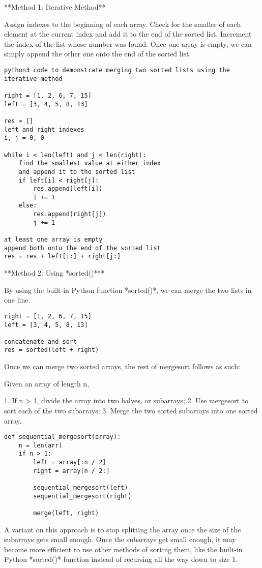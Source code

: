 **Method 1: Iterative Method**

Assign indexes to the beginning of each array. Check for the smaller of each element at the current index and add it to
the end of the sorted list. Increment the index of the list whose number was found. Once one array is empty, we can
simply append the other one onto the end of the sorted list.

\begin{verbatim}
python3 code to demonstrate merging two sorted lists using the iterative method

right = [1, 2, 6, 7, 15]
left = [3, 4, 5, 8, 13]

res = []
left and right indexes
i, j = 0, 0

while i < len(left) and j < len(right):
    find the smallest value at either index 
    and append it to the sorted list
    if left[i] < right[j]:
        res.append(left[i])
        i += 1
    else:
        res.append(right[j])
        j += 1

at least one array is empty
append both onto the end of the sorted list
res = res + left[i:] + right[j:]
\end{verbatim}

**Method 2: Using *sorted()***

By using the built-in Python function *sorted()*, we can merge the two lists in one line.

\begin{verbatim}
right = [1, 2, 6, 7, 15]
left = [3, 4, 5, 8, 13]

concatenate and sort
res = sorted(left + right)
\end{verbatim}

Once we can merge two sorted arrays, the rest of mergesort follows as such:

Given an array of length n,

1. If n > 1, divide the array into two halves, or subarrays;
2. Use mergesort to sort each of the two subarrays;
3. Merge the two sorted subarrays into one sorted array.

\begin{verbatim}
def sequential_mergesort(array):
    n = len(arr)
    if n > 1:
        left = array[:n / 2]
        right = array[n / 2:]

        sequential_mergesort(left)
        sequential_mergesort(right)

        merge(left, right)
\end{verbatim}

A variant on this approach is to stop splitting the array once the size of the subarrays gets small enough. Once the
subarrays get small enough, it may become more efficient to use other methods of sorting them, like the built-in
Python *sorted()* function instead of recursing all the way down to size 1.


